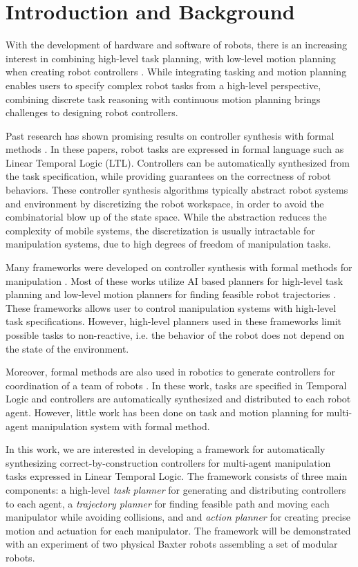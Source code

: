 \section{Introduction and Background}
With the development of hardware and software of robots,
there is an increasing interest in combining high-level task planning,
with low-level motion planning when creating robot controllers \cite{HKG2009,Belta2008,Bhatia2011,Dornhege2009,Erdem2011,Tom2014,Srivastava2014}.
While integrating tasking and motion planning enables users to specify complex robot tasks from a high-level perspective,
combining discrete task reasoning with continuous motion planning brings challenges to designing robot controllers.

Past research has shown promising results on controller synthesis with formal methods \cite{HKG2009,Belta2008,Bhatia2011,Wongpiromsarn,Maly,Vasile}.
In these papers, robot tasks are expressed in formal language such as Linear Temporal Logic (LTL).
Controllers can be automatically synthesized from the task specification,
while providing guarantees on the correctness of robot behaviors.
These controller synthesis algorithms typically abstract robot systems and environment by discretizing the robot workspace,
in order to avoid the combinatorial blow up of the state space.
While the abstraction reduces the complexity of mobile systems,
the discretization is usually intractable for manipulation systems,
due to high degrees of freedom of manipulation tasks.

Many frameworks were developed on controller synthesis with formal methods for manipulation \cite{Dornhege2009,Erdem2011,Tom2014,Srivastava2014,CambonAG09,KaelblingL11,PlakuH10,HeLKV15}.
Most of these works utilize AI based planners for high-level task planning and low-level motion planners for finding feasible robot trajectories \cite{Nau,Hoffmann01}.
These frameworks allows user to control manipulation systems with high-level task specifications.
However, high-level planners used in these frameworks limit possible tasks to non-reactive,
i.e. the behavior of the robot does not depend on the state of the environment.

Moreover, formal methods are also used in robotics to generate controllers for coordination of a team of robots \cite{ChenDSB12,KaramanF08,GuoTD14,VasileB14}.
In these work, tasks are specified in Temporal Logic and controllers are automatically synthesized and distributed to each robot agent. 
However, little work has been done on task and motion planning for multi-agent manipulation system with formal method.

In this work, we are interested in developing a framework for automatically synthesizing correct-by-construction controllers
for multi-agent manipulation tasks expressed in Linear Temporal Logic. The framework consists of three main components:
a high-level {\it task planner} for generating and distributing controllers to each agent,
a {\it trajectory planner} for finding feasible path and moving each manipulator while avoiding collisions,
and and {\it action planner} for creating precise motion and actuation for each manipulator.
The framework will be demonstrated with an experiment of two physical Baxter robots assembling a set of modular robots. 

